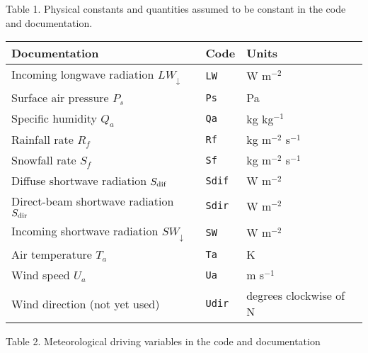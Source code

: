 \documentclass{article}
\begin{document}
Table 1. Physical constants and quantities assumed to be constant in the code and documentation.

\vskip20pt
\begin{tabular}{|l|l|l|}
\hline
Documentation                                & Code       & Units                  \\
\hline
Incoming longwave radiation $LW_\downarrow$  & {\tt LW}   & W m$^{-2}$             \\
Surface air pressure $P_s$                   & {\tt Ps}   & Pa                     \\
Specific humidity $Q_a$                      & {\tt Qa}   & kg kg$^{-1}$           \\
Rainfall rate $R_f$                          & {\tt Rf}   & kg m$^{-2}$ s$^{-1}$   \\
Snowfall rate $S_f$                          & {\tt Sf}   & kg m$^{-2}$ s$^{-1}$   \\
Diffuse shortwave radiation $S_{\rm dif}$    & {\tt Sdif} & W m$^{-2}$             \\
Direct-beam shortwave radiation $S_{\rm dir}$& {\tt Sdir} & W m$^{-2}$             \\
Incoming shortwave radiation $SW_\downarrow$ & {\tt SW}   & W m$^{-2}$             \\
Air temperature $T_a$                        & {\tt Ta}   & K                      \\
Wind speed $U_a$                             & {\tt Ua}   & m s$^{-1}$             \\
Wind direction (not yet used)                & {\tt Udir} & degrees clockwise of N \\
\hline 
\end{tabular}

Table 2. Meteorological driving variables in the code and documentation
\end{document}
